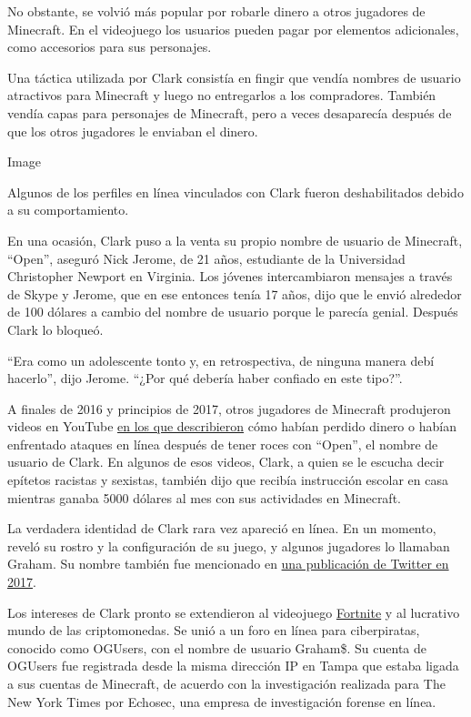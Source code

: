 No obstante, se volvió más popular por robarle dinero a otros jugadores
de Minecraft. En el videojuego los usuarios pueden pagar por elementos
adicionales, como accesorios para sus personajes.

Una táctica utilizada por Clark consistía en fingir que vendía nombres
de usuario atractivos para Minecraft y luego no entregarlos a los
compradores. También vendía capas para personajes de Minecraft, pero a
veces desaparecía después de que los otros jugadores le enviaban el
dinero.

Image

Algunos de los perfiles en línea vinculados con Clark fueron
deshabilitados debido a su comportamiento.

En una ocasión, Clark puso a la venta su propio nombre de usuario de
Minecraft, ``Open'', aseguró Nick Jerome, de 21 años, estudiante de la
Universidad Christopher Newport en Virginia. Los jóvenes intercambiaron
mensajes a través de Skype y Jerome, que en ese entonces tenía 17 años,
dijo que le envió alrededor de 100 dólares a cambio del nombre de
usuario porque le parecía genial. Después Clark lo bloqueó.

``Era como un adolescente tonto y, en retrospectiva, de ninguna manera
debí hacerlo'', dijo Jerome. ``¿Por qué debería haber confiado en este
tipo?''.

A finales de 2016 y principios de 2017, otros jugadores de Minecraft
produjeron videos en YouTube
\href{https://www.youtube.com/watch?v=CvrPXbk-BXw}{en los que
describieron} cómo habían perdido dinero o habían enfrentado ataques en
línea después de tener roces con ``Open'', el nombre de usuario de
Clark. En algunos de esos videos, Clark, a quien se le escucha decir
epítetos racistas y sexistas, también dijo que recibía instrucción
escolar en casa mientras ganaba 5000 dólares al mes con sus actividades
en Minecraft.

La verdadera identidad de Clark rara vez apareció en línea. En un
momento, reveló su rostro y la configuración de su juego, y algunos
jugadores lo llamaban Graham. Su nombre también fue mencionado en
\href{https://twitter.com/opengrahamclark/status/848014008632344576}{una
publicación de Twitter en 2017}.

Los intereses de Clark pronto se extendieron al videojuego
\href{https://www.nytimes.com/2018/07/25/arts/what-is-fortnite-battle-royale-nyt.html}{Fortnite}
y al lucrativo mundo de las criptomonedas. Se unió a un foro en línea
para ciberpiratas, conocido como OGUsers, con el nombre de usuario
Graham\$. Su cuenta de OGUsers fue registrada desde la misma dirección
IP en Tampa que estaba ligada a sus cuentas de Minecraft, de acuerdo con
la investigación realizada para The New York Times por Echosec, una
empresa de investigación forense en línea.

